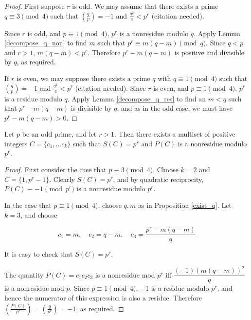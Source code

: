 \documentclass{article}
\begin{document}
\begin{proof}
  First suppose $r$ is odd. We may assume that there exists a prime
  $q \equiv 3 \pmod 4$ such that $\left( \frac{q}{p} \right) = -1$
  and $\frac{q^2}{4} < p^r$ (citation needed). 

  Since $r$ is odd, and $p \equiv 1 \pmod 4$, $p^r$ is a nonresidue
  modulo $q$. Apply Lemma \ref{decompose_q_non} to find $m$ such
  that $p^r \equiv m(q-m) \pmod q$. Since $q < p$ and $r > 1$,
  $m(q-m) < p^r$. Therefore $p^r - m(q-m)$ is positive and divisible
  by $q$, as required.

  If $r$ is even, we may suppose there exists a prime $q$ with $q
  \equiv 1 \pmod 4$ such that $\left( \frac{q}{p} \right) = -1$ and
  $\frac{q^2}{4} < p^r$ (citation needed). Since $r$ is even, and $p
  \equiv 1 \pmod 4$, $p^r$ is a residue modulo $q$. Apply Lemma
  \ref{decompose_q_res} to find an $m < q$ such that $p^r - m(q-m)$ is
  divisible by $q$, and as in the odd case, we must have $p^r - m(q-m)
  > 0$.
\end{proof}
\begin{thm}
  \label{exist_decomp}
  Let $p$ be an odd prime, and let $r > 1$. Then there exists a
  multiset of positive integers $C = \{c_1, \ldots c_k\}$ such that
  $S(C) = p^r$ and $P(C)$ is a nonresidue modulo $p^r$.
\end{thm}
\begin{proof}
  First consider the case that $p \equiv 3 \pmod 4$. Choose $k = 2$
  and $C = \{1, p^r-1\}$. Clearly $S(C) = p^r$, and by quadratic
  reciprocity, $P(C) \equiv -1 \pmod {p^r}$ is a nonresidue modulo
  $p^r$.

  In the case that $p \equiv 1 \pmod 4$, choose $q,m$ as in
  Proposition \ref{exist_q}. Let $k=3$, and choose 

  \[c_1 = m, \quad c_2 =  q-m, \quad c_3 = \frac{p^r - m(q-m)}{q}\]

  It is easy to check that $S(C) = p^r$.

  The quantity $P(C) = c_1c_2c_3$ is a nonresidue mod $p^r$ iff
  $\dfrac{(-1)(m(q-m))^2}{q}$ is a nonresidue mod $p$. Since $p \equiv
  1 \pmod 4$, $-1$ is a residue modulo $p^r$, and hence the numerator
  of this expression is also a residue. Therefore $\left(
    \frac{P(C)}{p^r} \right) = \left( \frac{q}{p^r} \right) = -1$, as
  required.
\end{proof}
\end{document}
